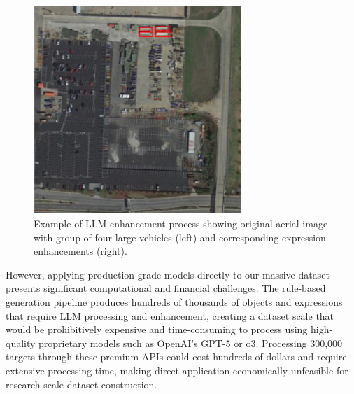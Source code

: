 \begin{figure}[H]
\centering
\begin{minipage}{0.5\textwidth}
\centering
\includegraphics[width=0.7\textwidth]{Images/example_group.png}
\end{minipage}%
\begin{minipage}{0.5\textwidth}
\centering
\hspace{-1cm}
\end{minipage}
\caption{Example of LLM enhancement process showing original aerial image with group of four large vehicles (left) and corresponding expression enhancements (right).}
\label{fig:llm_enhancement_example}
\end{figure}

However, applying production-grade models directly to our massive dataset presents significant computational and financial challenges. The rule-based generation pipeline produces hundreds of thousands of objects and expressions that require LLM processing and enhancement, creating a dataset scale that would be prohibitively expensive and time-consuming to process using high-quality proprietary models such as OpenAI's GPT-5 or o3. Processing 300,000 targets through these premium APIs could cost hundreds of dollars and require extensive processing time, making direct application economically unfeasible for research-scale dataset construction.

